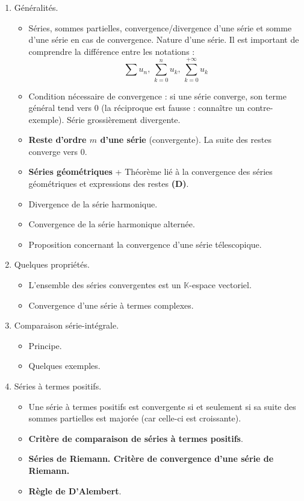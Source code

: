 \documentclass[twoside,a4paper,french,10pt]{VcCours}
\begin{document}
\begin{enumerate}
\item Généralités.
\begin{itemize}
\item Séries, sommes partielles, convergence/divergence d'une série et somme d'une série en cas de convergence.  Nature d'une série. Il est important de comprendre la différence entre les notations :
$$ \sum u_n, \,  \sum_{k=0}^n u_k, \, \sum_{k=0}^{+ \infty} u_k $$
\item Condition nécessaire de convergence : si une série converge, son terme général tend vers $0$ (la réciproque est fausse : connaître un contre-exemple). Série grossièrement divergente.
\item \textbf{Reste d'ordre $m$ d'une série} (convergente). La suite des restes converge vers $0$.
\item \textbf{Séries géométriques} + Théorème lié à la convergence des séries géométriques et expressions des restes \textbf{(D)}.
\item Divergence de la série harmonique.
\item Convergence de la série harmonique alternée.
\item Proposition concernant la convergence d'une série télescopique.
\end{itemize}
\item Quelques propriétés.
\begin{itemize}
\item L'ensemble des séries convergentes est un $\mathbb{K}$-espace vectoriel.
\item Convergence d'une série à termes complexes.
\end{itemize}
\item Comparaison série-intégrale.
\begin{itemize}
\item Principe.
\item Quelques exemples.
\end{itemize}
\item Séries à termes positifs.
\begin{itemize}
\item Une série à termes positifs est convergente si et seulement si sa suite des sommes partielles est majorée (car celle-ci est croissante).
\item \textbf{Critère de comparaison de séries à termes positifs}. 
\item \textbf{Séries de Riemann. Critère de convergence d'une série de Riemann.}
\item \textbf{Règle de D'Alembert}. 

\end{itemize}
\end{enumerate}
\end{document}
